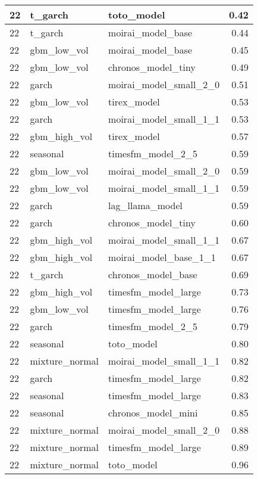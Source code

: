 {\begin{tabular}{lllr}
\midrule
22 & t\_garch & toto\_model & 0.42 \\
\midrule
22 & t\_garch & moirai\_model\_base & 0.44 \\
\midrule
22 & gbm\_low\_vol & moirai\_model\_base & 0.45 \\
\midrule
22 & gbm\_low\_vol & chronos\_model\_tiny & 0.49 \\
\midrule
22 & garch & moirai\_model\_small\_2\_0 & 0.51 \\
\midrule
22 & gbm\_low\_vol & tirex\_model & 0.53 \\
\midrule
22 & garch & moirai\_model\_small\_1\_1 & 0.53 \\
\midrule
22 & gbm\_high\_vol & tirex\_model & 0.57 \\
\midrule
22 & seasonal & timesfm\_model\_2\_5 & 0.59 \\
\midrule
22 & gbm\_low\_vol & moirai\_model\_small\_2\_0 & 0.59 \\
\midrule
22 & gbm\_low\_vol & moirai\_model\_small\_1\_1 & 0.59 \\
\midrule
22 & garch & lag\_llama\_model & 0.59 \\
\midrule
22 & garch & chronos\_model\_tiny & 0.60 \\
\midrule
22 & gbm\_high\_vol & moirai\_model\_small\_1\_1 & 0.67 \\
\midrule
22 & gbm\_high\_vol & moirai\_model\_base\_1\_1 & 0.67 \\
\midrule
22 & t\_garch & chronos\_model\_base & 0.69 \\
\midrule
22 & gbm\_high\_vol & timesfm\_model\_large & 0.73 \\
\midrule
22 & gbm\_low\_vol & timesfm\_model\_large & 0.76 \\
\midrule
22 & garch & timesfm\_model\_2\_5 & 0.79 \\
\midrule
22 & seasonal & toto\_model & 0.80 \\
\midrule
22 & mixture\_normal & moirai\_model\_small\_1\_1 & 0.82 \\
\midrule
22 & garch & timesfm\_model\_large & 0.82 \\
\midrule
22 & seasonal & timesfm\_model\_large & 0.83 \\
\midrule
22 & seasonal & chronos\_model\_mini & 0.85 \\
\midrule
22 & mixture\_normal & moirai\_model\_small\_2\_0 & 0.88 \\
\midrule
22 & mixture\_normal & timesfm\_model\_large & 0.89 \\
\midrule
22 & mixture\_normal & toto\_model & 0.96 \\

\end{tabular}}
